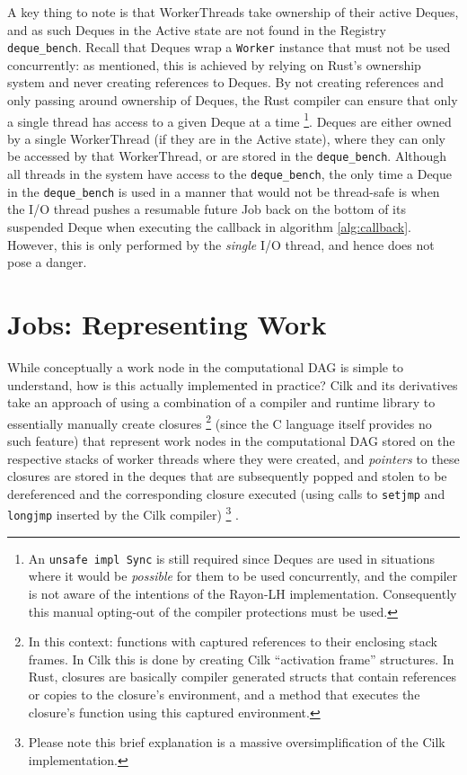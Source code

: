 \documentclass[bsc,frontabs,singlespacing,parskip,deptreport,normalheadings]{infthesis}
\begin{document}
A key thing to note is that WorkerThreads take ownership of their active Deques,
and as such Deques in the Active state are not found in the Registry
\texttt{deque\_bench}. Recall that Deques wrap a \texttt{Worker} instance that
must not be used concurrently: as mentioned, this is achieved by relying on
Rust's ownership system and never creating references to Deques. By not creating
references and only passing around ownership of Deques, the Rust compiler can
ensure that only a single thread has access to a given Deque at a time
\footnote{An \texttt{unsafe impl Sync} is still required since Deques are used
in situations where it would be \textit{possible} for them to be used
concurrently, and the compiler is not aware of the intentions of the Rayon-LH
implementation. Consequently this manual opting-out of the compiler protections
must be used.}. Deques are either owned by a single WorkerThread (if they are in
the Active state), where they can only be accessed by that WorkerThread, or are
stored in the \texttt{deque\_bench}. Although all threads in the system have
access to the \texttt{deque\_bench}, the only time a Deque in the
\texttt{deque\_bench} is used in a manner that would not be thread-safe is when
the I/O thread pushes a resumable future Job back on the bottom of its suspended
Deque when executing the callback in algorithm \ref{alg:callback}. However, this
is only performed by the \textit{single} I/O thread, and hence does not pose a
danger.

\section{Jobs: Representing Work}
\label{section:jobs:_representing_work}

While conceptually a work node in the computational DAG is simple to understand,
how is this actually implemented in practice? Cilk and its derivatives take an
approach of using a combination of a compiler and runtime library to essentially
manually create closures \footnote{In this context: functions with captured
    references to their enclosing stack frames. In Cilk this is done by creating
    Cilk ``activation frame'' structures. In Rust, closures are basically compiler
    generated structs that contain references or copies to the closure's
    environment, and a method that executes the closure's function using this
captured environment.} (since the C language itself provides no such feature)
that represent work nodes in the computational DAG stored on the respective
stacks of worker threads where they were created, and \textit{pointers} to these
closures are stored in the deques that are subsequently popped and stolen to be
dereferenced and the corresponding closure executed (using calls to
\texttt{setjmp} and \texttt{longjmp} inserted by the Cilk compiler)
\footnote{Please note this brief explanation is a massive oversimplification of
the Cilk implementation.} \cite{frigo_implementation_1998}.
\end{document}
